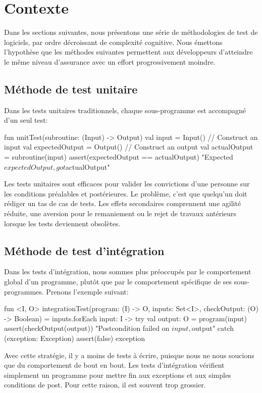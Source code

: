 \section{Contexte}

Dans les sections suivantes, nous présentons une série de méthodologies de test de logiciels, par ordre décroissant de complexité cognitive. Nous émettons l'hypothèse que les méthodes suivantes permettent aux développeurs d'atteindre le même niveau d'assurance avec un effort progressivement moindre.

\subsection{Méthode de test unitaire}

\noindent Dans les tests unitaires traditionnels, chaque sous-programme est accompagné d'un seul test:
%
\begin{kotlinlisting}
fun unitTest(subroutine: (Input) -> Output) {
    val input = Input() // Construct an input
    val expectedOutput = Output() // Construct an output
    val actualOutput = subroutine(input)
    assert(expectedOutput == actualOutput) { "Expected $expectedOutput, got $actualOutput" }
}
\end{kotlinlisting}
%
Les tests unitaires sont efficaces pour valider les convictions d'une personne sur les conditions préalables et postérieures. Le problème, c'est que quelqu'un doit rédiger un tas de cas de tests. Les effets secondaires comprennent une agilité réduite, une aversion pour le remaniement ou le rejet de travaux antérieurs lorsque les tests deviennent obsolètes.

\subsection{Méthode de test d'intégration}

\noindent Dans les tests d'intégration, nous sommes plus préoccupés par le comportement global d'un programme, plutôt que par le comportement spécifique de ses sous-programmes. Prenons l'exemple suivant:

\begin{kotlinlisting}
fun <I, O> integrationTest(program: (I) -> O, inputs: Set<I>, checkOutput: (O) -> Boolean) =
    inputs.forEach { input: I ->
        try {
            val output: O = program(input)
            assert(checkOutput(output)) { "Postcondition failed on $input, $output" }
        } catch (exception: Exception) {
            assert(false) { exception }
        }
    }
\end{kotlinlisting}
%
Avec cette stratégie, il y a moins de tests à écrire, puisque nous ne nous soucions que du comportement de bout en bout. Les tests d'intégration vérifient simplement un programme pour mettre fin aux exceptions et aux simples conditions de post. Pour cette raison, il est souvent trop grossier.

